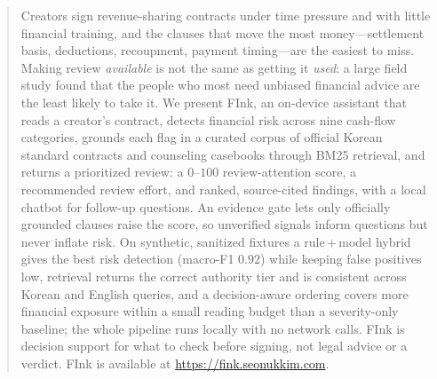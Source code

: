 \documentclass{article}
\theoremstyle{plain}
\begin{document}

\printAffiliationsAndNotice{}

\begin{abstract}
Creators sign revenue-sharing contracts under time pressure and with little
financial training, and the clauses that move the most money---settlement basis,
deductions, recoupment, payment timing---are the easiest to miss. Making review
\emph{available} is not the same as getting it \emph{used}: a large field study
found that the people who most need unbiased financial advice are the least
likely to take it. We present FInk, an on-device assistant that reads a creator's
contract, detects financial risk across nine cash-flow categories, grounds each
flag in a curated corpus of official Korean standard contracts and counseling
casebooks through BM25 retrieval, and returns a prioritized review: a
$0$--$100$ review-attention score, a recommended review effort, and ranked,
source-cited findings, with a local chatbot for follow-up questions. An evidence
gate lets only officially grounded clauses raise the score, so unverified signals
inform questions but never inflate risk. On synthetic, sanitized fixtures a
rule\,+\,model hybrid gives the best risk detection (macro-F1 $0.92$) while
keeping false positives low, retrieval returns the correct authority tier and is
consistent across Korean and English queries, and a decision-aware ordering
covers more financial exposure within a small reading budget than a severity-only
baseline; the whole pipeline runs locally with no network calls. FInk is decision
support for what to check before signing, not legal advice or a verdict. FInk is
available at \url{https://fink.seonukkim.com}.
\end{abstract}
\end{document}
